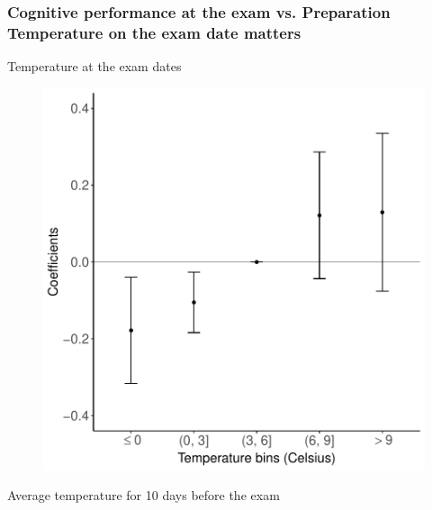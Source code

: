 \documentclass[10pt, pdfmx,hiresbb]{beamer}
\begin{document}
\begin{frame}\frametitle{Cognitive performance at the exam vs. Preparation \\ {\small Temperature on the exam date matters}}
  \begin{minipage}{0.43\textwidth}
    \begin{center}
      Temperature at the exam dates
    \end{center}
    \begin{figure}[h]
      \centering
      \includegraphics[width = \textwidth]{../Output/images/reg_pre10_exam_4.pdf}
    \end{figure}
  \end{minipage}
  \begin{minipage}{0.43\textwidth}
    \begin{center}
      Average temperature for 10 days before the exam
    \end{center}
    \begin{figure}[h]

\end{figure}
\end{minipage}
\end{frame}
\end{document}
